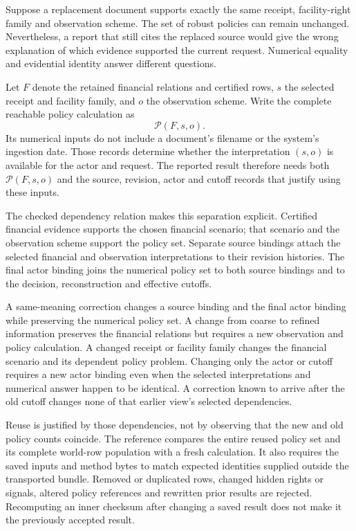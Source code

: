 Suppose a replacement document supports exactly the same receipt, facility-right family and observation scheme. The set of robust policies can remain unchanged. Nevertheless, a report that still cites the replaced source would give the wrong explanation of which evidence supported the current request. Numerical equality and evidential identity answer different questions.

Let $F$ denote the retained financial relations and certified rows, $s$ the selected receipt and facility family, and $o$ the observation scheme. Write the complete reachable policy calculation as
\begin{equation}
 \mathcal P(F,s,o).
 \label{eq:source-policy-dependency}
\end{equation}
Its numerical inputs do not include a document's filename or the system's ingestion date. Those records determine whether the interpretation $(s,o)$ is available for the actor and request. The reported result therefore needs both $\mathcal P(F,s,o)$ and the source, revision, actor and cutoff records that justify using these inputs.

The checked dependency relation makes this separation explicit. Certified financial evidence supports the chosen financial scenario; that scenario and the observation scheme support the policy set. Separate source bindings attach the selected financial and observation interpretations to their revision histories. The final actor binding joins the numerical policy set to both source bindings and to the decision, reconstruction and effective cutoffs.

A same-meaning correction changes a source binding and the final actor binding while preserving the numerical policy set. A change from coarse to refined information preserves the financial relations but requires a new observation and policy calculation. A changed receipt or facility family changes the financial scenario and its dependent policy problem. Changing only the actor or cutoff requires a new actor binding even when the selected interpretations and numerical answer happen to be identical. A correction known to arrive after the old cutoff changes none of that earlier view's selected dependencies.

Reuse is justified by those dependencies, not by observing that the new and old policy counts coincide. The reference compares the entire reused policy set and its complete world-row population with a fresh calculation. It also requires the saved inputs and method bytes to match expected identities supplied outside the transported bundle. Removed or duplicated rows, changed hidden rights or signals, altered policy references and rewritten prior results are rejected. Recomputing an inner checksum after changing a saved result does not make it the previously accepted result.

